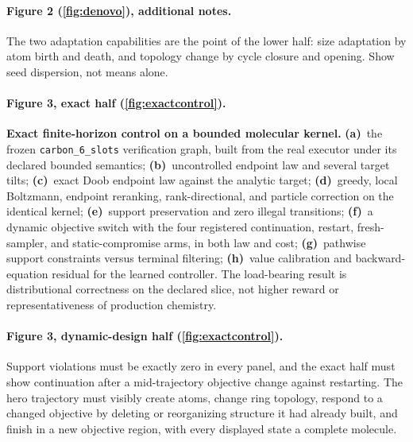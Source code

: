 \documentclass{article}
\theoremstyle{definition}
\theoremstyle{remark}
\begin{document}
\paragraph{Figure 2 (\cref{fig:denovo}), additional notes.}
The two adaptation capabilities are the point of the lower half: size adaptation by atom birth and death, and topology change by cycle closure and opening. Show seed dispersion, not means alone.

\paragraph{Figure 3, exact half (\cref{fig:exactcontrol}).}
\textbf{Exact finite-horizon control on a bounded molecular kernel.} \textbf{(a)}~the frozen \texttt{carbon\_6\_slots} verification graph, built from the real executor under its declared bounded semantics; \textbf{(b)}~uncontrolled endpoint law and several target tilts; \textbf{(c)}~exact Doob endpoint law against the analytic target; \textbf{(d)}~greedy, local Boltzmann, endpoint reranking, rank-directional, and particle correction on the identical kernel; \textbf{(e)}~support preservation and zero illegal transitions; \textbf{(f)}~a dynamic objective switch with the four registered continuation, restart, fresh-sampler, and static-compromise arms, in both law and cost; \textbf{(g)}~pathwise support constraints versus terminal filtering; \textbf{(h)}~value calibration and backward-equation residual for the learned controller. The load-bearing result is distributional correctness on the declared slice, not higher reward or representativeness of production chemistry.

\paragraph{Figure 3, dynamic-design half (\cref{fig:exactcontrol}).}
Support violations must be exactly zero in every panel, and the exact half must show continuation after a mid-trajectory objective change against restarting. The hero trajectory must visibly create atoms, change ring topology, respond to a changed objective by deleting or reorganizing structure it had already built, and finish in a new objective region, with every displayed state a complete molecule.
\end{document}
